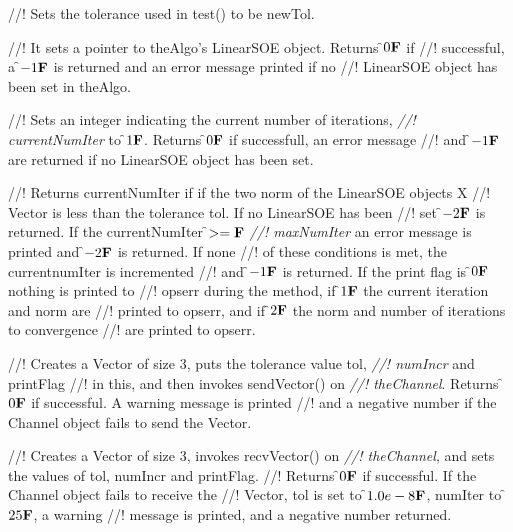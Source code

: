 //! Sets the tolerance used in test() to be \p newTol.

//! It sets a pointer to \p theAlgo's LinearSOE object. Returns \f$0{\bf F}$ if
//! successful, a \f$-1{\bf F}$ is returned and an error message printed if no
//! LinearSOE object has been set in \p theAlgo.

//! Sets an integer indicating the current number of iterations, {\em
//! currentNumIter} to \f$1{\bf F}$. Returns \f$0{\bf F}$ if successfull, an error message
//! and \f$-1{\bf F}$ are returned if no LinearSOE object has been set.

//! Returns {currentNumIter} if if the two norm of the LinearSOE objects X
//! Vector is less than the tolerance \p tol. If no LinearSOE has been
//! set \f$-2{\bf F}$ is returned. If the \p currentNumIter \f$>={\bf F}$ {\em
//! maxNumIter} an error message is printed and \f$-2{\bf F}$ is returned. If none
//! of these conditions is met, the \p currentnumIter is incremented
//! and \f$-1{\bf F}$ is returned. If the print flag is \f$0{\bf F}$ nothing is printed to
//! opserr during the method, if \f$1{\bf F}$ the current iteration and norm are
//! printed to opserr, and if \f$2{\bf F}$ the norm and number of iterations to convergence
//! are printed to opserr. 


//! Creates a Vector of size 3, puts the tolerance value \p tol, {\em
//! numIncr} and \p printFlag
//! in this, and then invokes sendVector() on {\em
//! theChannel}. Returns \f$0{\bf F}$ if successful. A warning message is printed
//! and a negative number if the Channel object fails to send the Vector. 

//! Creates a Vector of size 3, invokes recvVector() on {\em
//! theChannel}, and sets the values of \p tol, \p numIncr and \p printFlag.
//! Returns \f$0{\bf F}$ if successful. If the Channel object fails to receive the
//! Vector, \p tol is set to \f$1.0e-8{\bf F}$, \p numIter to \f$25{\bf F}$, a warning
//! message is printed, and a negative number returned.







